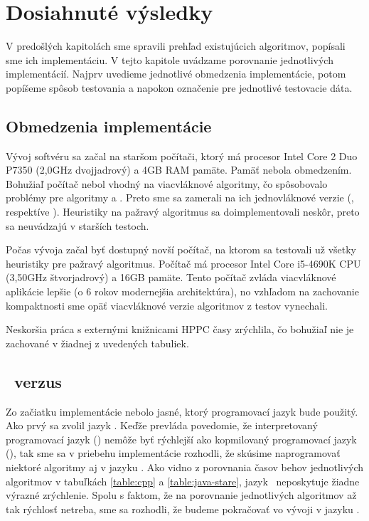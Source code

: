 \chapter{Dosiahnuté výsledky}\label{chap:vysledky}

V predošlých kapitolách sme spravili prehľad existujúcich algoritmov, popísali 
sme ich implementáciu. V tejto kapitole uvádzame porovnanie jednotlivých 
implementácií. Najprv uvedieme jednotlivé obmedzenia implementácie, potom 
popíšeme spôsob testovania a napokon označenie pre jednotlivé testovacie dáta.

\section{Obmedzenia implementácie}

Vývoj softvéru sa začal na staršom počítači, ktorý má procesor Intel Core 2 
Duo P7350 (2,0GHz dvojjadrový) a 4GB RAM pamäte. Pamäť nebola obmedzením. 
Bohužiaľ počítač 
nebol vhodný na viacvláknové algoritmy, čo spôsobovalo problémy pre algoritmy 
 a . Preto sme sa zamerali na ich jednovláknové 
verzie (, respektíve ). Heuristiky na pažravý 
algoritmus sa doimplementovali neskôr, preto sa neuvádzajú v starších testoch.

Počas vývoja začal byť dostupný novší počítač, na ktorom sa testovali už všetky 
heuristiky pre pažravý algoritmus. Počítač má procesor Intel Core i5-4690K CPU 
(3,50GHz štvorjadrový) a 16GB pamäte. Tento počítač zvláda viacvláknové 
aplikácie lepšie (o 6 rokov modernejšia architektúra), no 
vzhľadom na zachovanie kompaktnosti sme opäť viacvláknové verzie algoritmov z 
testov vynechali.

Neskoršia práca s externými knižnicami HPPC časy zrýchlila, čo bohužiaľ nie je 
zachované v žiadnej z uvedených tabuliek.

\section{\Java\ verzus \cpp}

Zo začiatku implementácie nebolo jasné, ktorý programovací jazyk bude použitý. 
Ako prvý sa zvolil jazyk \Java. Keďže prevláda povedomie, že interpretovaný 
programovací jazyk (\Java) nemôže byť rýchlejší ako kopmilovaný programovací 
jazyk (\cpp), tak sme sa v priebehu implementácie rozhodli, že skúsime 
naprogramovať niektoré algoritmy aj v jazyku \cpp. Ako vidno z porovnania časov 
behov jednotlivých algoritmov v tabuľkách \ref{table:cpp} a 
\ref{table:java-stare}, jazyk \cpp\ neposkytuje žiadne 
výrazné zrýchlenie. Spolu s faktom, že na porovnanie jednotlivých algoritmov až 
tak rýchlosť netreba, sme sa rozhodli, že budeme pokračovať vo vývoji v jazyku 
\Java.

